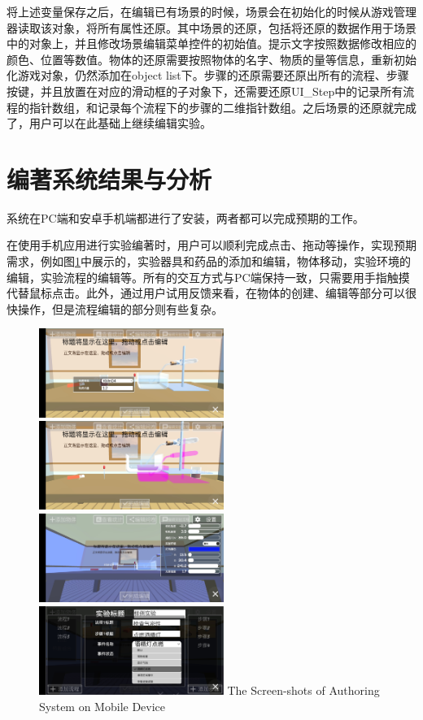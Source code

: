 将上述变量保存之后，在编辑已有场景的时候，场景会在初始化的时候从游戏管理器读取该对象，将所有属性还原。其中场景的还原，包括将还原的数据作用于场景中的对象上，并且修改场景编辑菜单控件的初始值。提示文字按照数据修改相应的颜色、位置等数值。物体的还原需要按照物体的名字、物质的量等信息，重新初始化游戏对象，仍然添加在object list下。步骤的还原需要还原出所有的流程、步骤按键，并且放置在对应的滑动框的子对象下，还需要还原UI\_Step中的记录所有流程的指针数组，和记录每个流程下的步骤的二维指针数组。之后场景的还原就完成了，用户可以在此基础上继续编辑实验。

\section{编著系统结果与分析}
系统在PC端和安卓手机端都进行了安装，两者都可以完成预期的工作。

在使用手机应用进行实验编著时，用户可以顺利完成点击、拖动等操作，实现预期需求，例如图\ref{fig:authorRes}中展示的，实验器具和药品的添加和编辑，物体移动，实验环境的编辑，实验流程的编辑等。所有的交互方式与PC端保持一致，只需要用手指触摸代替鼠标点击。此外，通过用户试用反馈来看，在物体的创建、编辑等部分可以很快操作，但是流程编辑的部分则有些复杂。

\begin{figure}[!htp]
  \centering
  \includegraphics[width=6cm]{figure/objRes.jpg}
  \hspace{1cm}
    \includegraphics[width=6cm]{figure/movingRes.jpg}
    \includegraphics[width=6cm]{figure/envirRes.jpg}
  \hspace{1cm}
  \includegraphics[width=6cm]{figure/procedureRes.jpg}
    {The Screen-shots of Authoring System on Mobile Device}
 \label{fig:authorRes}
\end{figure}


